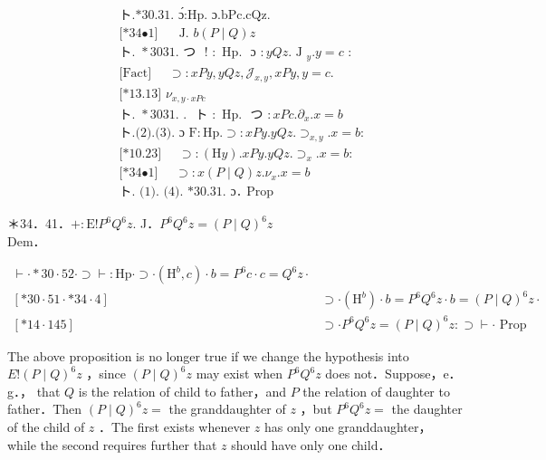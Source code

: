 \documentclass[10pt]{article}
\begin{document}
\begin{align*}
& \text { ト.*30.31. ɔ́:Hp. ɔ.bPc.cQz. } \\
& \text { [*34•1] } \quad \text { J. } b(P \mid Q) z  \tag{1}\\
& \text { ト. } * 3031 . \text { つ } \text { ! }: \text { Hp. } \text { ɔ }: y Q z . \text { J }_{y} . y=c \text { : } \\
& \text { [Fact] } \quad \supset: x P y, y Q z, \mathcal{J}_{x, y}, x P y, y=c \text {. } \\
& \text { [*13.13] } \nu_{x, y \cdot x P c}  \tag{2}\\
& \text { ト. } * 3031 \text {. . } \text { ト }: \text { Hp. } \text { つ }: x P c . \partial_{x} . x=b  \tag{3}\\
& \text { ト.(2).(3). ɔ } \mathrm{F}: \mathrm{Hp} . \supset: x P y . y Q z . \supset_{x, y} . x=b: \\
& \text { [*10.23] } \quad \supset:(\mathrm{H} y) . x P y . y Q z . \supset_{x} . x=b: \\
& \text { [*34•1] } \quad \supset: x(P \mid Q) z . \nu_{x} . x=b  \tag{4}\\
& \text { ト. (1). (4). *30.31. ɔ․ Prop }
\end{align*}


＊34．41．$+: \mathrm{E}!P^{6} Q^{6} z$. J．$P^{6} Q^{6} z=(P \mid Q)^{6} z$\\
Dem．

$$
\begin{array}{ll}
\vdash \cdot * 30 \cdot 52 \cdot \supset \vdash: \mathrm{Hp} \cdot \supset \cdot\left(\mathrm{H}^{b}, c\right) \cdot b=P^{6} c \cdot c=Q^{6} z \cdot \\
{[* 30 \cdot 51 \cdot * 34 \cdot 4]} & \supset \cdot\left(\mathrm{H}^{b}\right) \cdot b=P^{6} Q^{6} z \cdot b=(P \mid Q)^{6} z \cdot \\
{[* 14 \cdot 145]} & \supset \cdot P^{6} Q^{6} z=(P \mid Q)^{6} z: \supset \vdash \cdot \text { Prop }
\end{array}
$$

The above proposition is no longer true if we change the hypothesis into $E!(P \mid Q)^{6} z$ ，since $(P \mid Q)^{6} z$ may exist when $P^{6} Q^{6} z$ does not．Suppose，e．g．， that $Q$ is the relation of child to father，and $P$ the relation of daughter to father．Then $(P \mid Q)^{6} z=$ the granddaughter of $z$ ，but $P^{6} Q^{6} z=$ the daughter of the child of $z$ ．The first exists whenever $z$ has only one granddaughter， while the second requires further that $z$ should have only one child．
\end{document}
